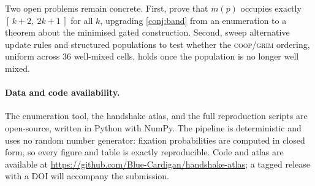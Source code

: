 Two open problems remain concrete. First, prove that $m(p)$ occupies exactly $[\,k+2,\ 2k+1\,]$
for all $k$, upgrading \cref{conj:band} from an enumeration to a theorem about the minimised
gated construction. Second, sweep alternative update rules and structured populations to test
whether the \textsc{coop}/\textsc{grim} ordering, uniform across $36$ well-mixed cells, holds
once the population is no longer well mixed.

\paragraph{Data and code availability.}
The enumeration tool, the handshake atlas, and the full reproduction scripts are open-source,
written in Python with NumPy. The pipeline is deterministic and uses no random number
generator: fixation probabilities are computed in closed form, so every figure and table is
exactly reproducible. Code and atlas are available at
\url{https://github.com/Blue-Cardigan/handshake-atlas}; a tagged release with a DOI will
accompany the submission.

